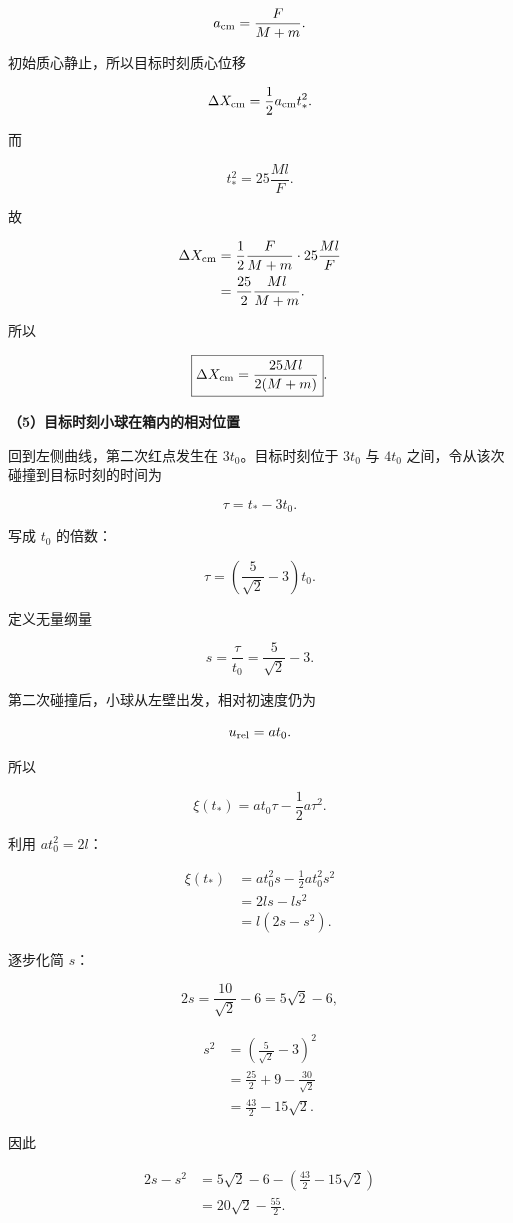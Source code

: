 \documentclass[12pt,a4paper,UTF8]{ctexart}
\begin{document}
\[
a_{\rm cm}=\frac{F}{M+m}.
\]

初始质心静止，所以目标时刻质心位移

\[
\Delta X_{\rm cm}=\frac12a_{\rm cm}t_*^2.
\]

而

\[
t_*^2=25\frac{Ml}{F}.
\]

故

\[
\begin{aligned}
\Delta X_{\rm cm}
&=\frac12\frac{F}{M+m}\cdot25\frac{Ml}{F}\\
&=\frac{25}{2}\frac{Ml}{M+m}.
\end{aligned}
\]

所以

\[
\boxed{
\Delta X_{\rm cm}=\frac{25Ml}{2(M+m)}
}.
\]

\textbf{（5）目标时刻小球在箱内的相对位置}

回到左侧曲线，第二次红点发生在 \(3t_0\)。目标时刻位于 \(3t_0\) 与
\(4t_0\) 之间，令从该次碰撞到目标时刻的时间为

\[
\tau=t_*-3t_0.
\]

写成 \(t_0\) 的倍数：

\[
\tau=\left(\frac5{\sqrt2}-3\right)t_0.
\]

定义无量纲量

\[
s=\frac{\tau}{t_0}=\frac5{\sqrt2}-3.
\]

第二次碰撞后，小球从左壁出发，相对初速度仍为

\[u_{\rm rel}=at_0.\]

所以

\[
\xi(t_*)=at_0\tau-\frac12a\tau^2.
\]

利用 \(at_0^2=2l\)：

\[
\begin{aligned}
\xi(t_*)
&=at_0^2s-\frac12at_0^2s^2\\
&=2ls-ls^2\\
&=l(2s-s^2).
\end{aligned}
\]

逐步化简 \(s\)：

\[
2s=\frac{10}{\sqrt2}-6=5\sqrt2-6,
\]

\[
\begin{aligned}
s^2
&=\left(\frac5{\sqrt2}-3\right)^2\\
&=\frac{25}{2}+9-\frac{30}{\sqrt2}\\
&=\frac{43}{2}-15\sqrt2.
\end{aligned}
\]

因此

\[
\begin{aligned}
2s-s^2
&=5\sqrt2-6-\left(\frac{43}{2}-15\sqrt2\right)\\
&=20\sqrt2-\frac{55}{2}.
\end{aligned}
\]
\end{document}
